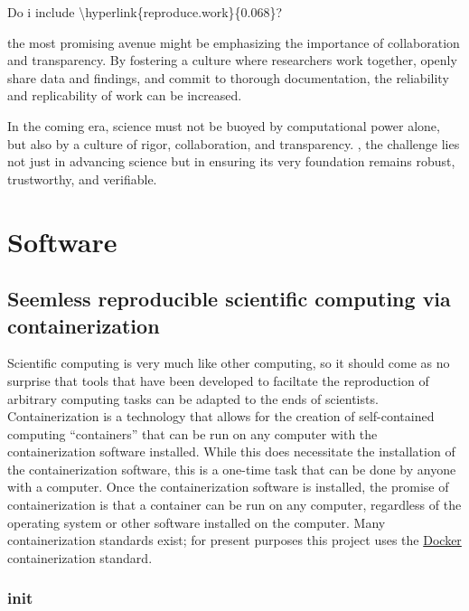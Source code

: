 Do i include \textbackslash{}hyperlink\{reproduce.work\}\{0.068\}?

the most promising avenue might be emphasizing the importance of collaboration and transparency. By fostering a culture where researchers work together, openly share data and findings, and commit to thorough documentation, the reliability and replicability of work can be increased.

In the coming era, science must not be buoyed by computational power alone, but also by a culture of rigor, collaboration, and transparency.
, the challenge lies not just in advancing science but in ensuring its very foundation remains robust, trustworthy, and verifiable. 

\hypertarget{software}{%
\section{Software}\label{software}}

\hypertarget{seemless-reproducible-scientific-computing-via-containerization}{%
\subsection{Seemless reproducible scientific computing via containerization}\label{seemless-reproducible-scientific-computing-via-containerization}}

Scientific computing is very much like other computing, so it should come as no surprise that tools that have been developed to faciltate the reproduction of arbitrary computing tasks can be adapted to the ends of scientists. Containerization is a technology that allows for the creation of self-contained computing ``containers'' that can be run on any computer with the containerization software installed. While this does necessitate the installation of the containerization software, this is a one-time task that can be done by anyone with a computer. Once the containerization software is installed, the promise of containerization is that a container can be run on any computer, regardless of the operating system or other software installed on the computer. Many containerization standards exist; for present purposes this project uses the \href{https://www.docker.com/}{Docker} containerization standard.

\hypertarget{init}{%
\subsubsection{init}\label{init}}

